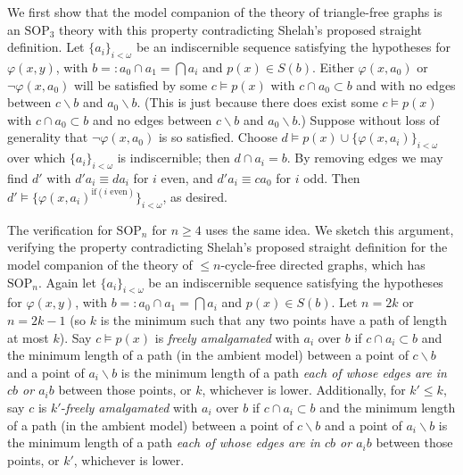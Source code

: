 \documentclass[10pt,a4paper]{amsart}
\begin{document}
    We first show that the model companion of the theory of triangle-free graphs is an $\mathrm{SOP}_{3}$ theory with this property contradicting Shelah's proposed straight definition. Let $\{a_{i}\}_{i < \omega}$ be an indiscernible sequence satisfying the hypotheses for $\varphi(x, y)$, with $b =: a_{0} \cap a_{1} = \bigcap a_{i}$ and $p(x) \in S(b)$. Either $\varphi(x, a_{0})$ or $\neg\varphi(x, a_{0})$ will be satisfied by some $c \models p(x)$ with $c \cap a_{0} \subset b$ and with no edges between $c \backslash b$ and $a_{0} \backslash b$. (This is just because there does exist some $c \models p(x)$ with $c \cap a_{0} \subset b$ and no edges between $c \backslash b$ and $a_{0} \backslash b$.) Suppose without loss of generality that $\neg\varphi(x, a_{0})$ is so satisfied. Choose $d \models p(x) \cup \{\varphi(x, a_{i})\}_{ i < \omega}$ over which $\{a_{i}\}_{i< \omega}$ is indiscernible; then $d \cap a_{i} = b$. By removing edges we may find $d'$ with $d'a_{i} \equiv da_{i}$ for $i$ even, and $d'a_{i} \equiv c a_{0}$ for $i $ odd. Then $d' \models \{\varphi(x, a_{i})^{\text{if}(i \text{ even})} \}_{ i < \omega} $, as desired.


    The verification for $\mathrm{SOP}_{n}$ for $n \geq 4$ uses the same idea. We sketch this argument, verifying the property contradicting Shelah's proposed straight definition for the model companion of the theory of $\leq n$-cycle-free directed graphs, which has $\mathrm{SOP}_{n}$. Again let $\{a_{i}\}_{i < \omega}$ be an indiscernible sequence satisfying the hypotheses for $\varphi(x, y)$, with $b =: a_{0} \cap a_{1} = \bigcap a_{i}$ and $p(x) \in S(b)$. Let $n= 2k$ or $n = 2k-1$ (so $k$ is the minimum such that any two points have a path of length at most $k$). Say $c \models p(x)$ is \textit{freely amalgamated} with $a_{i}$ over $b$ if $c \cap a_{i} \subset b$ and the minimum length of a path (in the ambient model) between a point of $c \backslash b$ and a point of $a_{i} \backslash b$ is the minimum length of a path \textit{each of whose edges are in $cb$ or $a_{i}b$} between those points, or $k$, whichever is lower. Additionally, for $k' \leq k$, say $c$ is $k'$-\textit{freely amalgamated} with $a_{i}$ over $b$ if $c \cap a_{i} \subset b$ and the minimum length of a path (in the ambient model) between a point of $c \backslash b$ and a point of $a_{i} \backslash b$ is the minimum length of a path \textit{each of whose edges are in $cb$ or $a_{i}b$} between those points, or $k'$, whichever is lower.
    
\end{document}

